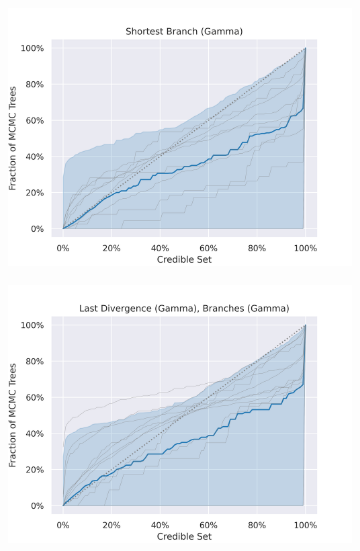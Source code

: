 \documentclass[10pt,letterpaper]{article}
\begin{document}
\begin{figure}[h!]
	\begin{subfigure}[b]{0.45\textwidth}
		\centering
		\includegraphics[width=\textwidth]{figures/bio-ccd1-credible-sets-Shortest Branch (Gamma).png}
	\end{subfigure}
	\begin{subfigure}[b]{0.45\textwidth}
		\centering
		\includegraphics[width=\textwidth]{figures/bio-ccd1-credible-sets-Last Divergence (Gamma), Branches (Gamma).png}
	\end{subfigure}
	
	\label{fig:credible-regions}
\end{figure}
\end{document}
